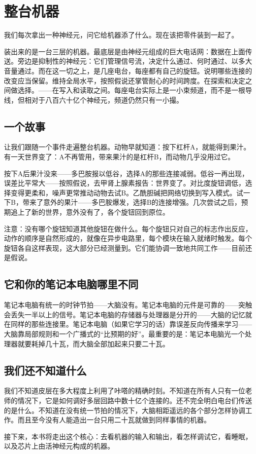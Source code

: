 \chapter{整台机器}


我们每次拿出一种神经元，问它给机器添了什么。现在该把零件装到一起了。

装出来的是一台三层的机器。最底层是由神经元组成的巨大电话网：数据在上面传送。旁边是抑制性的神经元：它们管理信号流，决定什么通过、何时通过、以多大音量通过。而在这一切之上，是几座电台，每座都有自己的旋钮。说明哪些连接的改变应当保留。维持全局水平，按照假说还掌管耐心的时间跨度。在探索和决定之间做选择。——在写入和读取之间。每座电台实际上是一小束频道，而不是一根导线，但相对于八百六十亿个神经元，频道仍然只有一小撮。

\section*{一个故事}

让我们跟随一个事件走遍整台机器。动物早就知道：按下杠杆A，就能得到果汁。有一天世界变了：A不再管用，带来果汁的是杠杆B，而动物几乎没用过它。

按下A后果汁没来——多巴胺报以低谷，选择A的那些连接减弱。低谷一再出现，误差比平常大——按照假说，去甲肾上腺素报告：世界变了。对比度旋钮调低，选择变得更柔和，噪声更常推动动物去试B。乙酰胆碱把网络切换到写入模式。试一下B，带来了意外的果汁——多巴胺爆发，选择B的连接增强。几次尝试之后，预期追上了新的世界，意外没有了，各个旋钮回到原位。

注意：没有哪个旋钮知道其他旋钮在做什么。每个旋钮只对自己的标志作出反应，动作的顺序是自然形成的，就像在异步电路里，每个模块在输入就绪时触发。每个旋钮各自这样表现，这大部分已经测量到。它们能协调一致地共同工作——目前还是假说。

\section*{它和你的笔记本电脑哪里不同}

笔记本电脑有统一的时钟节拍——大脑没有。笔记本电脑的元件是可靠的——突触会丢失一半以上的信号。笔记本电脑的存储器与处理器是分开的——大脑的记忆就在同样的那些连接里。笔记本电脑（如果它学习的话）靠误差反向传播来学习——大脑靠局部规则和一个广播式的“比预期的好”。最重要的是：笔记本电脑光一个处理器就要耗掉几十瓦，而大脑全部加起来只要二十瓦。

\section*{我们还不知道什么}

我们不知道皮层在多大程度上利用了咔嗒的精确时刻。不知道在所有人只有一位老师的情况下，它是如何调好多层回路中数十亿个连接的。还不完全明白电台们传送的是什么。不知道在没有统一节拍的情况下，大脑相距遥远的各个部分怎样协调工作。而且至今没有人能造出一台只用二十瓦就做到同样事情的机器。

接下来，本书将走出这个核心：去看机器的输入和输出，看怎样调试它，看睡眠，以及芯片上由活神经元构成的机器。

